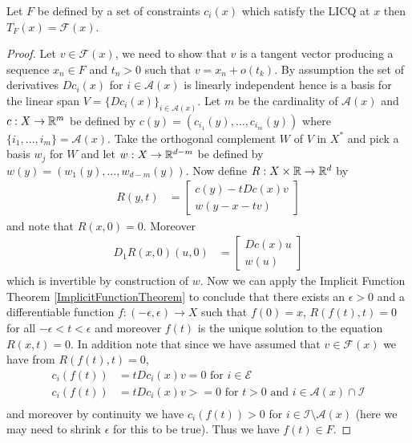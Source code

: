 \begin{prop}Let $F$ be defined by a set of constraints $c_i(x)$ which
  satisfy the LICQ at $x$ then $T_F(x) = \mathcal{F}(x)$.
\end{prop}
\begin{proof}
Let $v \in \mathcal{F}(x)$, we need to show that $v$ is a tangent
vector producing a sequence $x_n \in F$ and $t_n > 0$ such that $v = x_n + o(t_k)$. 
By assumption the set of derivatives $Dc_i(x)$ for $i \in
\mathcal{A}(x)$ is linearly independent hence is a basis for the linear 
span $V = \lbrace Dc_i(x) \rbrace_{i \in \mathcal{A}(x)}$.  Let $m$ be the cardinality of $\mathcal{A}(x)$ and $c : X \to \mathbb{R}^m$ 
be defined by $c(y) = (c_{i_1}(y), \dotsc, c_{i_m}(y))$ where $\lbrace i_1, \dotsc, i_m \rbrace = \mathcal{A}(x)$.
Take the orthogonal complement $W$ of $V$ 
in $X^*$ and pick a basis $w_j$ for $W$ and let $w : X \to \mathbb{R}^{d-m}$ be defined by $w(y) = (w_1(y), \dotsc, w_{d-m}(y))$.  Now define $R : X \times \mathbb{R} \to \mathbb{R}^d$ by
\begin{align*}
R(y,t) &= \begin{bmatrix}
c(y) - t Dc(x) v \\
w(y - x - tv)
\end{bmatrix}
\end{align*}
and note that $R(x,0) = 0$.  Moreover 
\begin{align*}
D_1R(x,0)(u, 0) &= \begin{bmatrix}
Dc(x) u \\
w(u)
\end{bmatrix}
\end{align*}
which is invertible by construction of $w$.  Now we can apply the Implicit Function Theorem \ref{ImplicitFunctionTheorem} to 
conclude that there exists an $\epsilon > 0$ and a differentiable function $f : (-\epsilon, \epsilon) \to X$ such that $f(0) = x$, $R(f(t), t) = 0$ 
for all $-\epsilon < t < \epsilon$ and moreover $f(t)$ is the unique solution to the equation $R(x,t) = 0$.  In addition note that
since we have assumed that $v \in \mathcal{F}(x)$ we have from $R(f(t), t) = 0$,
\begin{align*}
c_i(f(t)) &= t Dc_i(x) v = 0 \text{ for $i \in \mathcal{E}$} \\
c_i(f(t)) &= t Dc_i(x) v >= 0 \text{ for $t > 0$ and $i \in \mathcal{A}(x)\cap \mathcal{I}$} \\
\end{align*}
and moreover by continuity we have $c_i(f(t)) > 0$ for $i \in \mathcal{I} \setminus \mathcal{A}(x)$ (here we may need to shrink $\epsilon$ for this to be true).  Thus we have $f(t) \in F$.  




\end{proof}
